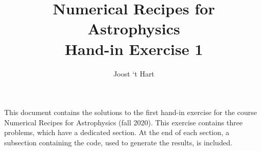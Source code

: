 \documentclass[a4paper,10pt]{article}
\title{Numerical Recipes for Astrophysics \\Hand-in Exercise 1}
\author{Joost `t Hart}
\begin{document}
\maketitle
This document contains the solutions to the first hand-in exercise for the course Numerical Recipes for Astrophysics (fall 2020).  This exercise contains three problems, which have a dedicated section. At the end of each section, a subsection containing the code, used to generate the results, is included.




\end{document}
